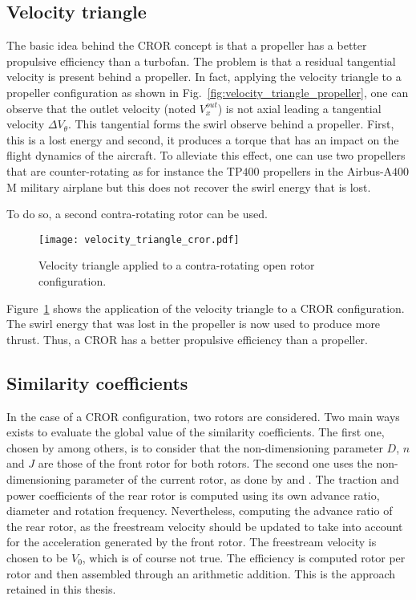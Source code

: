 \subsection{Velocity triangle}
\label{sub:cror_velocity_triangle}

The basic idea behind the CROR concept is that a propeller has a 
better propulsive efficiency than a turbofan. The problem is that
a residual tangential velocity is present behind a propeller.
In fact, applying the velocity triangle to a propeller configuration
as shown in Fig.~\ref{fig:velocity_triangle_propeller}, one can
observe that the outlet velocity (noted $V^{out}_x$) is not axial
leading a tangential velocity $\Delta V_{\theta}$. This tangential forms
the swirl observe behind a propeller. First, this is a lost energy and
second, it produces a torque that has an impact on the flight dynamics
of the aircraft. To alleviate this effect, one can use two propellers
that are counter-rotating as for instance the TP$400$ propellers
in the Airbus-A$400$M military airplane but this does not recover
the swirl energy that is lost.

To do so, a second contra-rotating rotor can be used.
\begin{figure}[htbp]
  \centering
  \texttt{[image: velocity\_triangle\_cror.pdf]}
  \caption{Velocity triangle applied to a contra-rotating open rotor configuration.}
  \label{fig:velocity_triangle_cror}
\end{figure}
Figure~\ref{fig:velocity_triangle_cror} shows the application
of the velocity triangle to a CROR configuration. The swirl
energy that was lost in the propeller is now used to 
produce more thrust. Thus, a CROR has a better propulsive
efficiency than a propeller.


\subsection{Similarity coefficients}
\label{sub:cror_similarity_coeff}

In the case of a CROR configuration, two rotors are considered.
Two main ways exists to evaluate the global value of the
similarity coefficients. The first one, chosen by
\citet{Bechet2011} among others, is to consider
that the non-dimensioning parameter $D$, $n$ and $J$ are those
of the front rotor for both rotors. 
The second one uses the non-dimensioning parameter of the current rotor,
as done by \citet{Stuermer2008} and \citet{Zachariadis2011}.
The traction and power coefficients of the rear rotor is
computed using its own advance ratio, diameter and rotation frequency.
Nevertheless, computing the advance ratio of the rear rotor, as
the freestream velocity should be updated to take into account
for the acceleration generated by the front rotor. The freestream
velocity is chosen to be $V_0$, which is of course not true.
The efficiency is computed rotor per rotor and then
assembled through an arithmetic addition. This is the approach retained
in this thesis.
